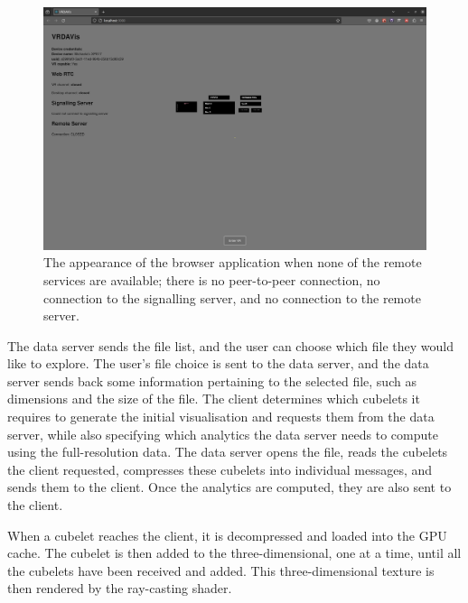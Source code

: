 \begin{figure}
    \centering
    \includegraphics[width=\linewidth]{figures/screenshots/4.png}
    \caption{The appearance of the browser application when none of the remote services are available; there is no peer-to-peer connection, no connection to the signalling server, and no connection to the remote server.}
    \label{fig:screenshot-4}
\end{figure}

The data server sends the file list, and the user can choose which file they would like to explore. 
The user's file choice is sent to the data server, and the data server sends back some information pertaining to the selected file, such as dimensions and the size of the file. 
The client determines which cubelets it requires to generate the initial visualisation and requests them from the data server, while also specifying which analytics the data server needs to compute using the full-resolution data. 
The data server opens the file, reads the cubelets the client requested, compresses these cubelets into individual messages, and sends them to the client. 
Once the analytics are computed, they are also sent to the client.

When a cubelet reaches the client, it is decompressed and loaded into the GPU cache. 
The cubelet is then added to the three-dimensional, one at a time, until all the cubelets have been received and added. 
This three-dimensional texture is then rendered by the ray-casting shader.

